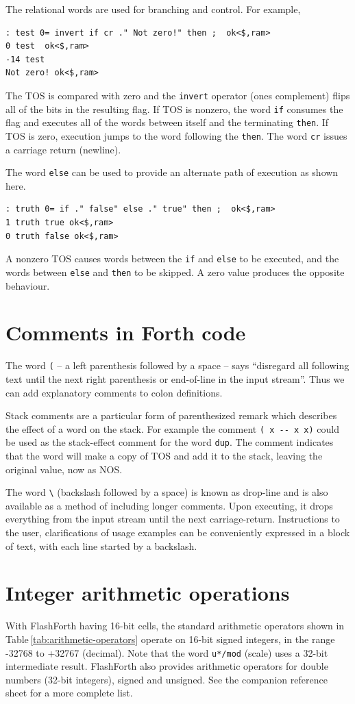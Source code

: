 \documentclass[12pt,a4paper]{article}
\begin{document}
\medskip
The relational words are used for branching and control.
For example,
\begin{verbatim}
: test 0= invert if cr ." Not zero!" then ;  ok<$,ram>
0 test  ok<$,ram>
-14 test 
Not zero! ok<$,ram>
\end{verbatim}
The TOS is compared with zero and the \verb!invert! operator (ones complement) flips
all of the bits in the resulting flag.
If TOS is nonzero, the word \verb!if! consumes the flag and executes all of the words
between itself and the terminating \verb!then!.
If TOS is zero, execution jumps to the word following the \verb!then!.
The word \verb!cr! issues a carriage return (newline).

\medskip
The word \verb!else! can be used to provide an alternate path of execution as shown here.
\begin{verbatim}
: truth 0= if ." false" else ." true" then ;  ok<$,ram>
1 truth true ok<$,ram>
0 truth false ok<$,ram>
\end{verbatim}
A nonzero TOS causes words between the \verb!if! and \verb!else! to be executed,
and the words between \verb!else! and \verb!then! to be skipped.
A zero value produces the opposite behaviour.


\bigskip
\section{Comments in Forth code}
\label{sec:commenting}
%
The word \verb!(! -- a left parenthesis followed by a space -- 
says ``disregard all following text until the next right parenthesis 
or end-of-line in the input stream''.
Thus we can add explanatory comments to colon definitions.

\medskip
Stack comments are a particular form of parenthesized remark which describes
the effect of a word on the stack.
For example the comment \verb!( x -- x x)! could be used as the stack-effect comment 
for the word \verb!dup!.
The comment indicates that the word will make a copy of TOS and add it to the stack,
leaving the original value, now as NOS.

\medskip
The word \verb!\! (backslash followed by a space) is known as drop-line and is also
available as a method of including longer comments.
Upon executing, it drops everything from the input stream until the next carriage-return.
Instructions to the user, clarifications of usage examples can be conveniently expressed
in a block of text, with each line started by a backslash.


\bigskip
\section{Integer arithmetic operations}
\label{sec:arithmetic}
%
With FlashForth having 16-bit cells, the standard arithmetic operators 
shown in Table\,\ref{tab:arithmetic-operators}
operate on 16-bit signed integers, in the range -32768 to +32767 (decimal).
Note that the word \verb!u*/mod! (scale) uses a 32-bit intermediate result.
FlashForth also provides arithmetic operators 
for double numbers (32-bit integers), signed and unsigned.
See the companion reference sheet \cite{jacobs_2012c} for a more complete list.
\end{document}
